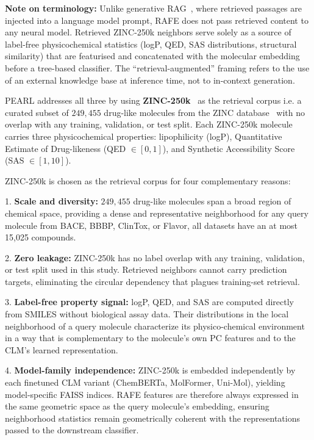 \documentclass[9pt,twocolumn,conference]{IEEEtran}
\begin{document}
\noindent\textbf{Note on terminology:} Unlike generative RAG~\cite{lewis2020rag}, where retrieved passages are injected into a language model prompt, RAFE does not pass retrieved content to any neural model. Retrieved ZINC-250k neighbors serve solely as a source of label-free physicochemical statistics (logP, QED, SAS distributions, structural similarity) that are featurised and concatenated with the molecular embedding before a tree-based classifier. The ``retrieval-augmented'' framing refers to the use of an external knowledge base at inference time, not to in-context generation. 

PEARL addresses all three by using \textbf{ZINC-250k}~\cite{gomez2018automatic} as the retrieval corpus i.e. a curated subset of $249,455$ drug-like molecules from the ZINC database~\cite{irwin2020zinc20} with no overlap with
any training, validation, or test split. Each ZINC-250k molecule carries three physicochemical properties: lipophilicity (logP), Quantitative Estimate of Drug-likeness (QED $\in [0,1]$), and Synthetic Accessibility Score (SAS $\in [1,10]$).

ZINC-250k is chosen as the retrieval corpus for four complementary reasons: 

1. \textbf{Scale and diversity:} $249,455$ drug-like molecules span a broad region of chemical space, providing a dense and representative neighborhood for any query molecule from BACE, BBBP, ClinTox, or Flavor, all datasets have an at most 15,025 compounds.

2. \textbf{Zero leakage:} ZINC-250k has no label overlap with any training, validation, or test split used in this study. Retrieved neighbors cannot carry prediction targets, eliminating the circular dependency that plagues training-set retrieval.

3. \textbf{Label-free property signal:} logP, QED, and SAS are computed directly from SMILES without biological assay data. Their distributions in the local neighborhood of a query molecule characterize its physico-chemical environment in a way that is complementary to the molecule's own PC features and to the CLM's learned representation.

4. \textbf{Model-family independence:} ZINC-250k is embedded independently by each finetuned CLM variant (ChemBERTa, MolFormer, Uni-Mol), yielding model-specific FAISS indices. RAFE features are therefore always expressed in the same geometric space as the query molecule's embedding, ensuring neighborhood statistics remain geometrically coherent with the representations passed to the downstream classifier.
\end{document}
